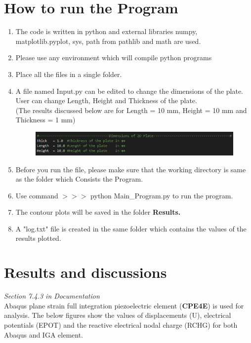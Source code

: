 \documentclass[12pt]{article}
\begin{document}
\section{How to run the Program}
\begin{enumerate}[leftmargin=*]
	\item The code is written in python and external libraries numpy, matplotlib.pyplot, sys, path from pathlib and math are used.
	\item Please use any environment which will compile python programs
	\item Place all the files in a single folder.
	\item A file named Input.py can be edited to change the dimensions of the plate. User can change Length, Height and Thickness of the plate. \\(The results discussed below are for Length = 10 mm, Height = 10 mm and Thickness = 1 mm)
	\begin{figure}[H]
		\begin{center}
			\includegraphics[scale=0.8]{Input.png} 
		\end{center}	
	\end{figure}
	\item Before you run the file, please make sure that the working directory is same as the folder  which
	Consists the Program.
	\item Use command  $>>>$ python Main\_Program.py to run the program.
	\item The contour plots will be saved in the folder \textbf{Results.}
	\item A "log.txt" file is created in the same folder which contains the values of the results plotted.
	
	
\end{enumerate}

\newpage

\section{Results and discussions}
\emph{Section 7.4.3 in Documentation}\\
Abaqus plane strain full integration piezoelectric element (\textbf{CPE4E}) is used for analysis. The below figures show the values of displacements (U), electrical potentials (EPOT) and the reactive electrical nodal charge (RCHG) for both Abaqus and IGA element.\\
\end{document}
